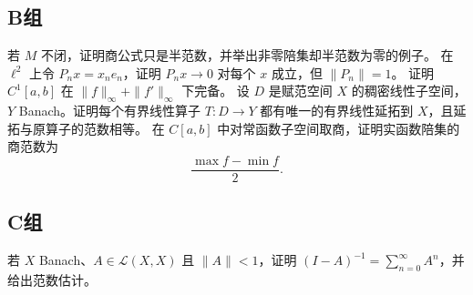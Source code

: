 \subsection*{B组}
\begin{enumerate}[label=\textbf{\thechapter.\arabic*.},resume]
若 \(M\) 不闭，证明商公式只是半范数，并举出非零陪集却半范数为零的例子。
在 \(\ell^2\) 上令 \(P_nx=x_ne_n\)，证明 \(P_nx\to0\) 对每个 \(x\) 成立，但 \(\|P_n\|=1\)。
证明 \(C^1[a,b]\) 在 \(\|f\|_\infty+\|f'\|_\infty\) 下完备。
设 \(D\) 是赋范空间 \(X\) 的稠密线性子空间，\(Y\) Banach。证明每个有界线性算子 \(T:D\to Y\) 都有唯一的有界线性延拓到 \(X\)，且延拓与原算子的范数相等。
在 \(C[a,b]\) 中对常函数子空间取商，证明实函数陪集的商范数为
\[
 \frac{\max f-\min f}{2}.
\]
\end{enumerate}
\subsection*{C组}
\begin{enumerate}[label=\textbf{\thechapter.\arabic*.},resume]
若 \(X\) Banach、\(A\in\mathcal L(X,X)\) 且 \(\|A\|<1\)，证明
\((I-A)^{-1}=\sum_{n=0}^\infty A^n\)，并给出范数估计。
\end{enumerate}
